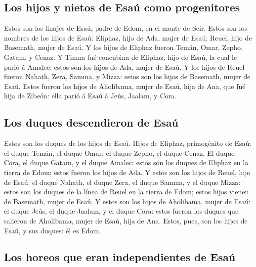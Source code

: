 \hypertarget{los-hijos-y-nietos-de-esauxfa-como-progenitores}{%
\subsection{Los hijos y nietos de Esaú como
progenitores}\label{los-hijos-y-nietos-de-esauxfa-como-progenitores}}

 Estos son los linajes de Esaú, padre de Edom, en el monte
de Seir.  Estos son los nombres de los hijos de Esaú:
Eliphaz, hijo de Ada, mujer de Esaú; Reuel, hijo de Basemath, mujer de
Esaú.  Y los hijos de Eliphaz fueron Temán, Omar, Zepho,
Gatam, y Cenaz.  Y Timna fué concubina de Eliphaz, hijo
de Esaú, la cual le parió á Amalec: estos son los hijos de Ada, mujer de
Esaú.  Y los hijos de Reuel fueron Nahath, Zera, Samma, y
Mizza: estos son los hijos de Basemath, mujer de Esaú. 
Estos fueron los hijos de Aholibama, mujer de Esaú, hija de Ana, que fué
hija de Zibeón: ella parió á Esaú á Jeús, Jaalam, y Cora.

\hypertarget{los-duques-descendieron-de-esauxfa}{%
\subsection{Los duques descendieron de
Esaú}\label{los-duques-descendieron-de-esauxfa}}

 Estos son los duques de los hijos de Esaú. Hijos de
Eliphaz, primogénito de Esaú: el duque Temán, el duque Omar, el duque
Zepho, el duque Cenaz,  El duque Cora, el duque Gatam, y
el duque Amalec: estos son los duques de Eliphaz en la tierra de Edom;
estos fueron los hijos de Ada.  Y estos son los hijos de
Reuel, hijo de Esaú: el duque Nahath, el duque Zera, el duque Samma, y
el duque Mizza: estos son los duques de la línea de Reuel en la tierra
de Edom; estos hijos vienen de Basemath, mujer de Esaú. 
Y estos son los hijos de Aholibama, mujer de Esaú: el duque Jeús, el
duque Jaalam, y el duque Cora: estos fueron los duques que salieron de
Aholibama, mujer de Esaú, hija de Ana.  Estos, pues, son
los hijos de Esaú, y sus duques: él es Edom.

\hypertarget{los-horeos-que-eran-independientes-de-esauxfa}{%
\subsection{Los horeos que eran independientes de
Esaú}\label{los-horeos-que-eran-independientes-de-esauxfa}}


